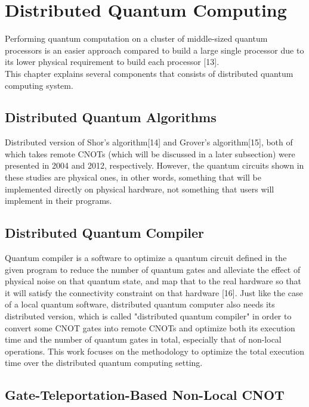 \section{Distributed Quantum Computing}
 
  Performing quantum computation on a cluster of middle-sized quantum processors is an easier approach compared to build a large single processor due to its lower physical requirement to build each processor [13].  \\
This chapter explains several components that consists of distributed quantum computing system.

\subsection{Distributed Quantum Algorithms}

Distributed version of Shor's algorithm[14] and Grover's algorithm[15], both of which takes remote CNOTs (which will be discussed in a  later subsection) were presented in 2004 and 2012, respectively. 
However, the quantum circuits shown in these studies are physical ones, in other words, something that will be implemented directly on physical hardware, not something that users will implement in their programs. 

\subsection{Distributed Quantum Compiler}

 Quantum compiler is a software to optimize a quantum circuit defined in the given program to reduce the number of quantum gates and alleviate the effect of physical noise on that quantum state, and map that to the real hardware so that it will satisfy the connectivity constraint on that hardware [16].  Just like the case of a local quantum software, distributed quantum computer also needs its distributed version, which is called "distributed quantum compiler" in order to convert some CNOT gates into remote CNOTs and optimize both its execution time and the number of quantum gates in total, especially that of non-local operations.  This work focuses on the methodology to optimize the total execution time over the distributed quantum computing setting.
 
 \subsection{Gate-Teleportation-Based Non-Local CNOT}
 
